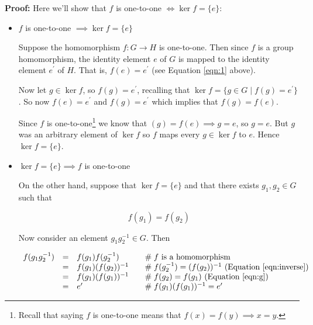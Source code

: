 \documentclass[11pt, oneside]{article}   	%
\theoremstyle{definition}
\begin{document}
\noindent
\textbf{Proof: }  Here we'll show that $f$ is one-to-one  $\iff \ker f =\{e\}$: 
\begin{itemize}
\item $f$ is one-to-one  $\implies \ker f =\{e\}$ 

Suppose the homomorphism $f : G \rightarrow H$ is one-to-one. Then since $f$ is a group homomorphism, the identity element $e$ of $G$ is mapped 
to the identity element $e^\prime$ of $H$. That is,  $f(e ) = e^\prime$ (see Equation \ref{eqn:1} above).

Now let $g \in \ker f$, so $f(g) = e^\prime$, recalling that $\ker f = \{g \in G \mid f(g) = e^\prime\}$. So now $f(e) = e^\prime$ and  $f(g) = e^\prime$ which 
implies that $f(g)=f(e)$. 
 
Since $f$ is one-to-one\footnote{Recall that saying $f$ is one-to-one means that $f(x) = f(y) \implies x = y$.} we know that  $(g) = f(e) \implies g = e$, so $g = e$. But $g$ was an 
arbitrary element of $\ker f$  so $f$ maps every $g \in \ker f$ to $e$. Hence $\ker f = \{e\}$. 

\item $\ker f = \{e\} \implies f$ is one-to-one

On the other hand, suppose that $\ker f = \{e\}$ and that there exists $g_1, g_2 \in G$ such that 

\begin{equation}
f(g_1) = f(g_2) 
\label{eqn:g}
\end{equation}

Now consider an element $g_1g_2^{-1} \in G$. Then

\begin{equation}
\begin{array}{rcll}
f(g_1g_2^{-1})
&=& f(g_1) f(g_2^{-1})                                                                                           &\quad \mathrel{\#} \text{$f$ is a homomorphism}   \\
&=& f(g_1) (f(g_2))^{-1}                                                                                           &\quad \mathrel{\#} f(g_2^{-1})   = (f(g_2))^{-1}  \text{ (Equation \ref{eqn:inverse})}  \\
&=& f(g_1) (f(g_1))^{-1}                                                                                           &\quad \mathrel{\#} f(g_2) = f(g_1)  \text{ (Equation \ref{eqn:g})} \\
&=& e^\prime                     &\quad \mathrel{\#} f(g_1) (f(g_1))^{-1}  = e^\prime
\end{array}
\label{eqn:eprime}
\end{equation}


\end{itemize}
\end{document}
